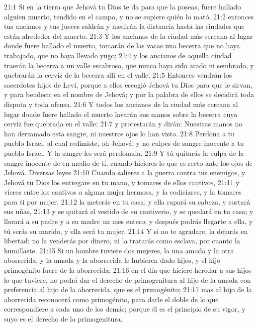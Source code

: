 21:1 Si en la tierra que Jehová tu Dios te da para que la poseas, fuere hallado alguien muerto, tendido en el campo, y no se supiere quién lo mató,  
21:2 entonces tus ancianos y tus jueces saldrán y medirán la distancia hasta las ciudades que están alrededor del muerto.  
21:3 Y los ancianos de la ciudad más cercana al lugar donde fuere hallado el muerto, tomarán de las vacas una becerra que no haya trabajado, que no haya llevado yugo;  
21:4 y los ancianos de aquella ciudad traerán la becerra a un valle escabroso, que nunca haya sido arado ni sembrado, y quebrarán la cerviz de la becerra allí en el valle.  
21:5 Entonces vendrán los sacerdotes hijos de Leví, porque a ellos escogió Jehová tu Dios para que le sirvan, y para bendecir en el nombre de Jehová; y por la palabra de ellos se decidirá toda disputa y toda ofensa.  
21:6 Y todos los ancianos de la ciudad más cercana al lugar donde fuere hallado el muerto lavarán sus manos sobre la becerra cuya cerviz fue quebrada en el valle;  
21:7 y protestarán y dirán: Nuestras manos no han derramado esta sangre, ni nuestros ojos lo han visto.  
21:8 Perdona a tu pueblo Israel, al cual redimiste, oh Jehová; y no culpes de sangre inocente a tu pueblo Israel. Y la sangre les será perdonada.  
21:9 Y tú quitarás la culpa de la sangre inocente de en medio de ti, cuando hicieres lo que es recto ante los ojos de Jehová.  
Diversas leyes  
21:10 Cuando salieres a la guerra contra tus enemigos, y Jehová tu Dios los entregare en tu mano, y tomares de ellos cautivos,  
21:11 y vieres entre los cautivos a alguna mujer hermosa, y la codiciares, y la tomares para ti por mujer,  
21:12 la meterás en tu casa; y ella rapará su cabeza, y cortará sus uñas,  
21:13 y se quitará el vestido de su cautiverio, y se quedará en tu casa; y llorará a su padre y a su madre un mes entero; y después podrás llegarte a ella, y tú serás su marido, y ella será tu mujer.  
21:14 Y si no te agradare, la dejarás en libertad; no la venderás por dinero, ni la tratarás como esclava, por cuanto la humillaste.  
21:15 Si un hombre tuviere dos mujeres, la una amada y la otra aborrecida, y la amada y la aborrecida le hubieren dado hijos, y el hijo primogénito fuere de la aborrecida;  
21:16 en el día que hiciere heredar a sus hijos lo que tuviere, no podrá dar el derecho de primogenitura al hijo de la amada con preferencia al hijo de la aborrecida, que es el primogénito;  
21:17 mas al hijo de la aborrecida reconocerá como primogénito, para darle el doble de lo que correspondiere a cada uno de los demás; porque él es el principio de su vigor, y suyo es el derecho de la primogenitura.  
